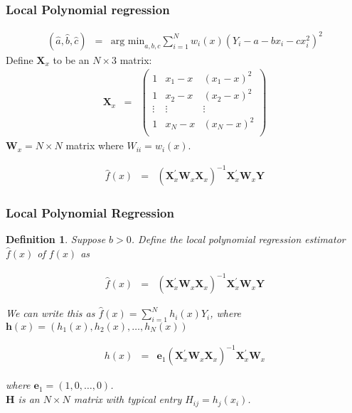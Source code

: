 \documentclass{beamer}
\newtheorem{defn}{Definition}
\numberwithin{equation}{section}
\begin{document}
\begin{frame}
\frametitle{Local Polynomial regression}

\begin{eqnarray}
(\hat{a}, \hat{b}, \hat{c} ) & = & \text{arg min}_{a,b,c} \sum_{i=1}^{N} w_{i}(x)(Y_{i} - a - bx_{i} - c x_{i}^2)^2 \nonumber 
\end{eqnarray}
Define $\boldsymbol{X}_{x}$ to be an $N \times 3$ matrix:
\begin{eqnarray}
\boldsymbol{X}_{x} & = & \begin{pmatrix}
1 & x_{1} - x & (x_{1} - x)^2 \\
1 & x_{2} - x & (x_{2} - x)^2 \\
\vdots & \vdots & \vdots \\
1 & x_{N} - x & (x_{N} - x)^2 \\
\end{pmatrix} \nonumber 
\end{eqnarray}
$\boldsymbol{W}_{x} = N \times N $ matrix where $W_{ii} = w_{i}(x)$.  

\begin{eqnarray}
\hat{f}(x) & = & \left( \boldsymbol{X}_{x}^{'}\boldsymbol{W}_{x}\boldsymbol{X}_{x}   \right)^{-1} \boldsymbol{X}_{x}^{'}\boldsymbol{W}_{x} \boldsymbol{Y} \nonumber 
\end{eqnarray}


\end{frame}


\begin{frame}
\frametitle{Local Polynomial Regression}

\begin{defn}
Suppose $b>0$.  Define the local polynomial regression estimator $\hat{f}(x)$ of $f(x)$ as 

\begin{eqnarray}
\hat{f}(x) & = & \left( \boldsymbol{X}_{x}^{'}\boldsymbol{W}_{x}\boldsymbol{X}_{x}   \right)^{-1} \boldsymbol{X}_{x}^{'}\boldsymbol{W}_{x} \boldsymbol{Y} \nonumber 
\end{eqnarray}

We can write this as $\hat{f}(x) = \sum_{i=1}^{N} h_{i}(x) Y_{i}$, where $\boldsymbol{h}(x) = (h_{1}(x), h_{2}(x), \hdots, h_{N} (x))$

\begin{eqnarray}
h(x)  & = & \boldsymbol{e}_{1} \left( \boldsymbol{X}_{x}^{'}\boldsymbol{W}_{x}\boldsymbol{X}_{x}   \right)^{-1} \boldsymbol{X}_{x}^{'}\boldsymbol{W}_{x}  \nonumber 
\end{eqnarray}

where $\boldsymbol{e}_{1} = (1, 0, \hdots, 0)$.  \\

$\boldsymbol{H}$ is an $N \times N$ matrix with typical entry $H_{ij} = h_{j}(x_{i})$. 

\end{defn}
\end{frame}
\end{document}
